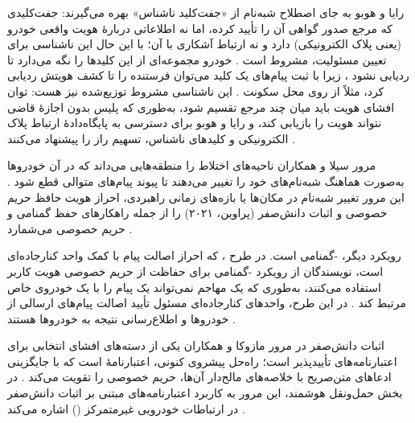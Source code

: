 رایا و هوبو به جای اصطلاح شبه‌نام از «جفت‌کلید ناشناس» بهره می‌گیرند: جفت‌کلیدی که مرجع صدور گواهی آن را تأیید کرده، اما نه اطلاعاتی دربارهٔ هویت واقعی خودرو (یعنی پلاک الکترونیکی) دارد و نه ارتباط آشکاری با آن؛ با این حال این ناشناسی برای تعیین مسئولیت، مشروط است \cite{SecuringVehicularAd}. خودرو مجموعه‌ای از این کلیدها را نگه می‌دارد تا ردیابی نشود \cite{SecuringVehicularAd}، زیرا با ثبت پیام‌های یک کلید می‌توان فرستنده را تا کشف هویتش ردیابی کرد، مثلاً از روی محل سکونت \cite{SecuringVehicularAd}. این ناشناسی مشروط توزیع‌شده نیز هست: توان افشای هویت باید میان چند مرجع تقسیم شود، به‌طوری که پلیس بدون اجازهٔ قاضی نتواند هویت را بازیابی کند، و رایا و هوبو برای دسترسی به پایگاه‌دادهٔ ارتباط پلاک الکترونیکی و کلیدهای ناشناس، تسهیم راز  را پیشنهاد می‌کنند \cite{SecuringVehicularAd}.

مرور سیلا و همکاران ناحیه‌های اختلاط را منطقه‌هایی می‌داند که در آن خودروها به‌صورت هماهنگ شبه‌نام‌های خود را تغییر می‌دهند تا پیوند پیام‌های متوالی قطع شود \cite{VanetSecurityPrivacy}. این مرور تغییر شبه‌نام در مکان‌ها یا بازه‌های زمانی راهبردی، احراز هویت حافظ حریم خصوصی و اثبات دانش‌صفر (پراوین، ۲۰۲۱) را از جمله راهکارهای حفظ گمنامی و حریم خصوصی می‌شمارد \cite{VanetSecurityPrivacy}.

رویکرد دیگر، -گمنامی است. در طرح ، که احراز اصالت پیام با کمک واحد کنارجاده‌ای است، نویسندگان از رویکرد -گمنامی برای حفاظت از حریم خصوصی هویت کاربر استفاده می‌کنند، به‌طوری که یک مهاجم نمی‌تواند یک پیام را با یک خودروی خاص مرتبط کند \cite{zhangRAISEEfficientRSUAided2008}. در این طرح، واحدهای کنارجاده‌ای مسئول تأیید اصالت پیام‌های ارسالی از خودروها و اطلاع‌رسانی نتیجه به خودروها هستند \cite{zhangRAISEEfficientRSUAided2008}.

اثبات دانش‌صفر در مرور مازوکا و همکاران یکی از دسته‌های افشای انتخابی برای اعتبارنامه‌های تأییدپذیر است؛ راه‌حل پیشروی کنونی، اعتبارنامهٔ  است که با جایگزینی ادعاهای متن‌صریح با خلاصه‌های مالح‌دار آن‌ها، حریم خصوصی را تقویت می‌کند \cite{mazzocca2025survey}. در بخش حمل‌ونقل هوشمند، این مرور به کاربرد اعتبارنامه‌های مبتنی بر اثبات دانش‌صفر در ارتباطات خودرویی غیرمتمرکز () اشاره می‌کند \cite{mazzocca2025survey}.
